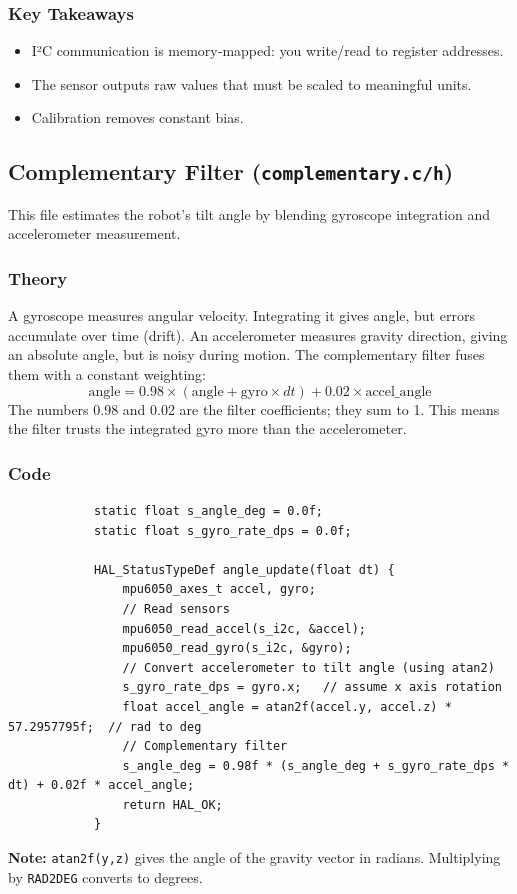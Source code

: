 \documentclass[12pt,a4paper]{article}
\begin{document}
		\subsubsection{Key Takeaways}
		\begin{itemize}
			\item I²C communication is memory‑mapped: you write/read to register addresses.
			\item The sensor outputs raw values that must be scaled to meaningful units.
			\item Calibration removes constant bias.
		\end{itemize}
		
		\subsection{Complementary Filter (\texttt{complementary.c/h})}
		This file estimates the robot’s tilt angle by blending gyroscope integration and accelerometer measurement.
		
		\subsubsection{Theory}
		A gyroscope measures angular velocity. Integrating it gives angle, but errors accumulate over time (drift). An accelerometer measures gravity direction, giving an absolute angle, but is noisy during motion. The complementary filter fuses them with a constant weighting:
		\[
		\text{angle} = 0.98 \times (\text{angle} + \text{gyro} \times dt) + 0.02 \times \text{accel\_angle}
		\]
		The numbers 0.98 and 0.02 are the filter coefficients; they sum to 1. This means the filter trusts the integrated gyro more than the accelerometer.
		
		\subsubsection{Code}
		\begin{lstlisting}
			static float s_angle_deg = 0.0f;
			static float s_gyro_rate_dps = 0.0f;
			
			HAL_StatusTypeDef angle_update(float dt) {
				mpu6050_axes_t accel, gyro;
				// Read sensors
				mpu6050_read_accel(s_i2c, &accel);
				mpu6050_read_gyro(s_i2c, &gyro);
				// Convert accelerometer to tilt angle (using atan2)
				s_gyro_rate_dps = gyro.x;   // assume x axis rotation
				float accel_angle = atan2f(accel.y, accel.z) * 57.2957795f;  // rad to deg
				// Complementary filter
				s_angle_deg = 0.98f * (s_angle_deg + s_gyro_rate_dps * dt) + 0.02f * accel_angle;
				return HAL_OK;
			}
		\end{lstlisting}
		\textbf{Note:} \texttt{atan2f(y,z)} gives the angle of the gravity vector in radians. Multiplying by \texttt{RAD2DEG} converts to degrees.
		
\end{document}

